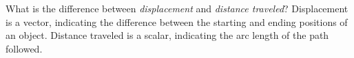 {What is the difference between \textit{displacement} and \textit{distance traveled}?
}
{
Displacement is a vector, indicating the difference between the starting and ending positions of an object. Distance traveled is a scalar, indicating the arc length of the path followed.
}

